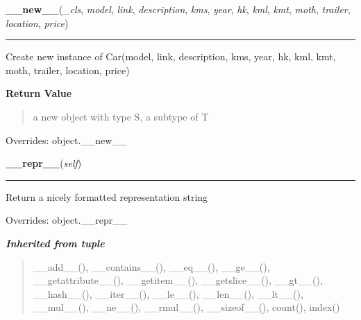 \hspace{.8\funcindent}\begin{boxedminipage}{\funcwidth}

    \raggedright \textbf{\_\_new\_\_}(\textit{\_cls}, \textit{model}, \textit{link}, \textit{description}, \textit{kms}, \textit{year}, \textit{hk}, \textit{kml}, \textit{kmt}, \textit{moth}, \textit{trailer}, \textit{location}, \textit{price})

    \vspace{-1.5ex}

    \rule{\textwidth}{0.5\fboxrule}
\setlength{\parskip}{2ex}
    Create new instance of Car(model, link, description, kms, year, hk, 
    kml, kmt, moth, trailer, location, price)

\setlength{\parskip}{1ex}
      \textbf{Return Value}
    \vspace{-1ex}

      \begin{quote}
      a new object with type S, a subtype of T

      \end{quote}

      Overrides: object.\_\_new\_\_

    \end{boxedminipage}

    \vspace{0.5ex}

\hspace{.8\funcindent}\begin{boxedminipage}{\funcwidth}

    \raggedright \textbf{\_\_repr\_\_}(\textit{self})

    \vspace{-1.5ex}

    \rule{\textwidth}{0.5\fboxrule}
\setlength{\parskip}{2ex}
    Return a nicely formatted representation string

\setlength{\parskip}{1ex}
      Overrides: object.\_\_repr\_\_

    \end{boxedminipage}


\large{\textbf{\textit{Inherited from tuple}}}

\begin{quote}
\_\_add\_\_(), \_\_contains\_\_(), \_\_eq\_\_(), \_\_ge\_\_(), \_\_getattribute\_\_(), \_\_getitem\_\_(), \_\_getslice\_\_(), \_\_gt\_\_(), \_\_hash\_\_(), \_\_iter\_\_(), \_\_le\_\_(), \_\_len\_\_(), \_\_lt\_\_(), \_\_mul\_\_(), \_\_ne\_\_(), \_\_rmul\_\_(), \_\_sizeof\_\_(), count(), index()
\end{quote}


